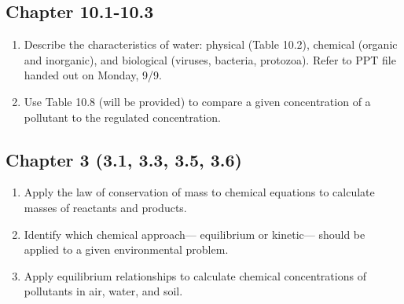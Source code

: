 \documentclass[12pt,letterpaper]{article}
\begin{document}
\subsection *{Chapter 10.1-10.3}
\begin{enumerate}
\item Describe the characteristics of water: physical (Table 10.2), chemical (organic and inorganic), and biological (viruses, bacteria, protozoa). Refer to PPT file handed out on Monday, 9/9.
\item Use Table 10.8 (will be provided) to compare a given concentration of a pollutant to the regulated concentration.
\end{enumerate}

\subsection *{Chapter 3 (3.1, 3.3, 3.5, 3.6)}

\begin{enumerate}
\item Apply the law of conservation of mass to chemical equations to calculate masses of reactants and products.
\item Identify which chemical approach--- equilibrium or kinetic--- should be applied to a given environmental problem.
\item Apply equilibrium relationships to calculate chemical concentrations of pollutants in air, water, and soil.

\end{enumerate}
\end{document}
